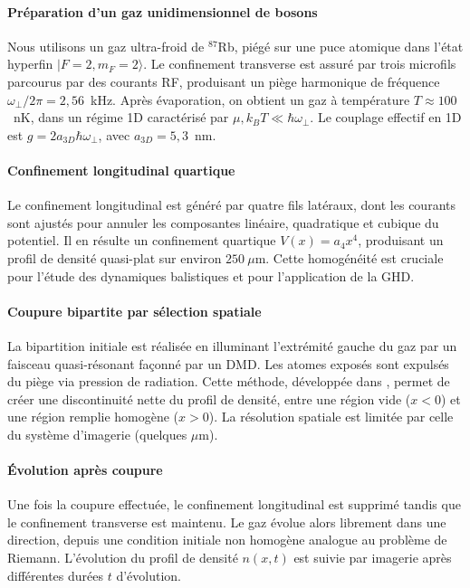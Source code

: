 \paragraph{Préparation d’un gaz unidimensionnel de bosons} 
Nous utilisons un gaz ultra-froid de $^{87}$Rb, piégé sur une puce atomique dans l’état hyperfin $|F=2,m_F=2\rangle$. Le confinement transverse est assuré par trois microfils parcourus par des courants RF, produisant un piège harmonique de fréquence $\omega_\perp/2\pi = 2{,}56$~kHz. Après évaporation, on obtient un gaz à température $T \approx 100$~nK, dans un régime 1D caractérisé par $\mu, k_B T \ll \hbar \omega_\perp$. Le couplage effectif en 1D est $g = 2 a_{3D} \hbar \omega_\perp$, avec $a_{3D} = 5{,}3$~nm.

\paragraph{Confinement longitudinal quartique}
Le confinement longitudinal est généré par quatre fils latéraux, dont les courants sont ajustés pour annuler les composantes linéaire, quadratique et cubique du potentiel. Il en résulte un confinement quartique $V(x) = a_4 x^4$, produisant un profil de densité quasi-plat sur environ $250~\mu$m. Cette homogénéité est cruciale pour l’étude des dynamiques balistiques et pour l’application de la GHD.

\paragraph{Coupure bipartite par sélection spatiale}
La bipartition initiale est réalisée en illuminant l’extrémité gauche du gaz par un faisceau quasi-résonant façonné par un DMD. Les atomes exposés sont expulsés du piège via pression de radiation. Cette méthode, développée dans \cite{PhysRevLett.133.113402}, permet de créer une discontinuité nette du profil de densité, entre une région vide ($x<0$) et une région remplie homogène ($x>0$). La résolution spatiale est limitée par celle du système d’imagerie (quelques $\mu$m).

\paragraph{Évolution après coupure}
Une fois la coupure effectuée, le confinement longitudinal est supprimé tandis que le confinement transverse est maintenu. Le gaz évolue alors librement dans une direction, depuis une condition initiale non homogène analogue au problème de Riemann. L’évolution du profil de densité $n(x,t)$ est suivie par imagerie après différentes durées $t$ d’évolution.


